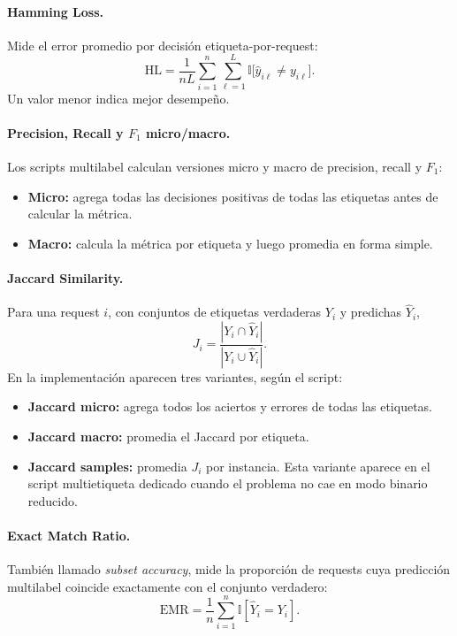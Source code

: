 \documentclass[12pt,oneside]{report}
\newcommand{\ind}{\mathbb{I}} %
\begin{document}
\paragraph{Hamming Loss.}
Mide el error promedio por decisión etiqueta-por-request:
\[
\mathrm{HL}=\frac{1}{nL}\sum_{i=1}^n\sum_{\ell=1}^L \ind\big[\hat{y}_{i\ell}\ne y_{i\ell}\big].
\]
Un valor menor indica mejor desempeño.

\paragraph{Precision, Recall y $F_1$ micro/macro.}
Los scripts multilabel calculan versiones micro y macro de precision, recall y $F_1$:
\begin{itemize}[leftmargin=*]
  \item \textbf{Micro:} agrega todas las decisiones positivas de todas las etiquetas antes de calcular la métrica.
  \item \textbf{Macro:} calcula la métrica por etiqueta y luego promedia en forma simple.
\end{itemize}

\paragraph{Jaccard Similarity.}
Para una request $i$, con conjuntos de etiquetas verdaderas $Y_i$ y predichas $\hat{Y}_i$,
\[
J_i = \frac{|Y_i \cap \hat{Y}_i|}{|Y_i \cup \hat{Y}_i|}.
\]
En la implementación aparecen tres variantes, según el script:
\begin{itemize}[leftmargin=*]
  \item \textbf{Jaccard micro:} agrega todos los aciertos y errores de todas las etiquetas.
  \item \textbf{Jaccard macro:} promedia el Jaccard por etiqueta.
  \item \textbf{Jaccard samples:} promedia $J_i$ por instancia. Esta variante aparece en el script multietiqueta dedicado cuando el problema no cae en modo binario reducido.
\end{itemize}

\paragraph{Exact Match Ratio.}
También llamado \textit{subset accuracy}, mide la proporción de requests cuya predicción multilabel coincide exactamente con el conjunto verdadero:
\[
\mathrm{EMR}=\frac{1}{n}\sum_{i=1}^n \ind[\hat{Y}_i = Y_i].
\]
\end{document}
